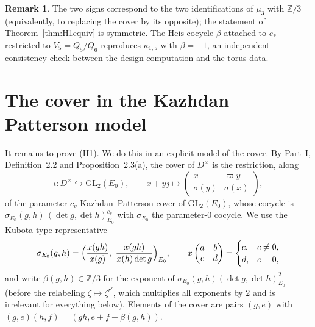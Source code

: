 \documentclass[11pt]{article}
\newcommand{\Z}{\mathbb Z}
\newcommand{\Heis}{\mathrm{Heis}}
\theoremstyle{plain}
\theoremstyle{definition}
\newtheorem{remark}[theorem]{Remark}
\begin{document}
\begin{remark}
The two signs correspond to the two identifications of $\mu_3$ with
$\Z/3$ (equivalently, to replacing the cover by its opposite); the
statement of Theorem~\ref{thm:H1equiv} is symmetric.  The
$\Heis$-cocycle $\beta$ attached to $e_*$ restricted to
$V_5=Q_5/Q_6$ reproduces $\kappa_{1,5}$ with $\beta=-1$, an independent
consistency check between the design computation and the torus data.
\end{remark}

\section{The cover in the Kazhdan--Patterson model}\label{sec:model}
It remains to prove (H1).  We do this in an explicit model of the
cover.  By Part~I, Definition~2.2 and Proposition~2.3(a), the cover of
$D^\times$ is the restriction, along
\begin{equation}\label{eq:iota}
 \iota:D^\times\hookrightarrow\mathrm{GL}_2(E_0),\qquad
 x+yj\longmapsto\begin{pmatrix}x&\varpi y\\\sigma(y)&\sigma(x)\end{pmatrix},
\end{equation}
of the parameter-$c_v$ Kazhdan--Patterson cover of $\mathrm{GL}_2(E_0)$,
whose cocycle is $\sigma_{E_0}(g,h)\,(\det g,\det h)_{E_0}^{c_v}$ with
$\sigma_{E_0}$ the parameter-$0$ cocycle.  We use the Kubota-type
representative
\begin{equation}\label{eq:kubota}
 \sigma_{E_0}(g,h)=\Bigl(\frac{x(gh)}{x(g)},\ \frac{x(gh)}{x(h)\det g}\Bigr)_{E_0},
 \qquad x\begin{pmatrix}a&b\\c&d\end{pmatrix}=\begin{cases}c,&c\ne0,\\ d,&c=0,\end{cases}
\end{equation}
and write $\beta(g,h)\in\Z/3$ for the exponent of
$\sigma_{E_0}(g,h)(\det g,\det h)_{E_0}^{2}$ (before the relabeling
$\zeta\mapsto\zeta^{r'}$, which multiplies all exponents by $2$ and is
irrelevant for everything below).  Elements of the cover are pairs
$(g,e)$ with $(g,e)(h,f)=(gh,e+f+\beta(g,h))$.
\end{document}
